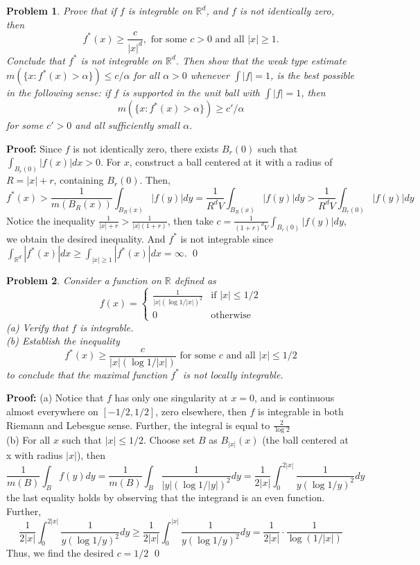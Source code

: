 \documentclass[12pt]{article}
\newtheorem{problem}{Problem}
\begin{document}
\begin{problem}
Prove that if $f$ is integrable on $\mathbb{R}^{d}$, and $f$ is not identically zero, then 
$$
f^{*}(x)\geq \frac{c}{|x|^{d}}, \text{ for some } c > 0 \text{ and all } |x| \geq 1.
$$ Conclude that $f^{*}$ is not integrable on $\mathbb{R}^{d}$. Then show that the weak type estimate $m(\{x: f^{*}(x) > \alpha\}) \leq c/\alpha$ for all $\alpha > 0 $ whenever $\int |f| = 1$, is the best possible in the following sense: if $f$ is supported in the unit ball with $\int |f| = 1$, then   
$$
m(\{x : f^{*}(x) > \alpha\}) \geq c'/\alpha
$$ for some $c' > 0$ and all sufficiently small $\alpha$.
\end{problem}

\textbf{Proof:} Since $f$ is not identically zero, there exists $B_{r}(0)$ such that $\int_{B_{r}(0)}|f(x)|dx > 0$. For $x$, construct a ball centered at it with a radius of $R = |x| + r$, containing $B_{r}(0)$. Then, 
$$
f^{*}(x) > \frac{1}{m(B_{R}(x))}\int_{B_{R}(x)}|f(y)|dy = \frac{1}{R^{d}V}\int_{B_{R}(x)}|f(y)|dy > \frac{1}{R^dV}\int_{B_{r}(0)}|f(y)|dy
$$
Notice the inequality $\frac{1}{|x| + r}>\frac{1}{|x|(1+r)}$, then take $c = \frac{1}{(1+r)^{d}V}\int_{B_{r}(0)}|f(y)|dy$, we obtain the desired inequality. And $f^{*}$ is not integrable since $\int_{\mathbb{R}^{d}}|f^{*}(x)|dx \geq \int_{|x| \geq 1}|f^{*}(x)|dx = \infty$. \qed 

\begin{problem}
Consider a function on $\mathbb{R}$ defined as 
$$
f(x)=\left\{\begin{matrix}
  \frac{1}{|x|(\log 1/|x|)^{2}}& \text{if } |x| \leq 1/2\\
  0& \text{otherwise}
\end{matrix}\right.
$$
(a) Verify that $f$ is integrable. \\
(b) Establish the inequality 
$$
f^{*}(x)\geq \frac{c}{|x|(\log 1/|x|)} \text{ for some } c \text{ and all } |x|\leq 1/2
$$
\indent to conclude that the maximal function $f^{*}$ is not locally integrable.
\end{problem}

\textbf{Proof:} (a) Notice that $f$ has only one singularity at $x=0$, and is continuous almost everywhere on $[-1/2, 1/2]$, zero elsewhere, then $f$ is integrable in both Riemann and Lebesgue sense. Further, the integral is equal to $\frac{2}{\log 2}$ \\
\indent (b) For all $x$ such that $|x|\leq 1/2$.  Choose set $B$ as $B_{|x|}(x)$ (the ball centered at x with radius $|x|$), then 
$$
\frac{1}{m(B)}\int_{B} f(y)dy=\frac{1}{m(B)}\int_{B}\frac{1}{|y|(\log 1/|y|)^{2}}dy=\frac{1}{2|x|}\int_{0}^{2|x|}\frac{1}{y(\log 1/y)^{2}}dy
$$
the last equality holds by observing that the integrand is an even function. Further, 
$$
\frac{1}{2|x|}\int_{0}^{2|x|}\frac{1}{y(\log 1/y)^{2}}dy\geq \frac{1}{2|x|}\int_{0}^{|x|}\frac{1}{y(\log 1/y)^{2}}dy=\frac{1}{2|x|}\cdot \frac{1}{\log(1/|x|)}
$$
Thus, we find the desired $c=1/2$ \qed 
\end{document}
